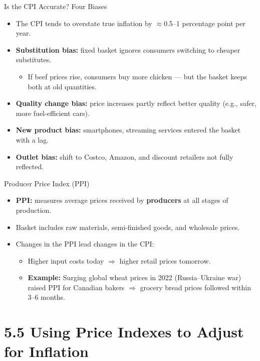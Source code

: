 \documentclass[aspectratio=169]{beamer}
\begin{document}
\begin{frame}{Is the CPI Accurate? Four Biases}
\transfade
\begin{itemize}[<+->]
  \item The CPI tends to \alert{overstate} true inflation by $\approx$0.5--1 percentage point per year.
  \item \textbf{Substitution bias:} fixed basket ignores consumers switching to cheaper substitutes.
  \begin{itemize}[<+->]
    \item If beef prices rise, consumers buy more chicken --- but the basket keeps both at old quantities.
  \end{itemize}
  \item \textbf{Quality change bias:} price increases partly reflect better quality (e.g., safer, more fuel-efficient cars).
  \item \textbf{New product bias:} smartphones, streaming services entered the basket with a lag.
  \item \textbf{Outlet bias:} shift to Costco, Amazon, and discount retailers not fully reflected.
\end{itemize}
\end{frame}

\begin{frame}{Producer Price Index (PPI)}
\transfade
\begin{itemize}[<+->]
  \item \textbf{PPI:} measures average prices received by \textbf{producers} at all stages of production.
  \item Basket includes raw materials, semi-finished goods, and wholesale prices.
  \item Changes in the PPI \alert{lead} changes in the CPI:
  \begin{itemize}[<+->]
    \item Higher input costs today $\Rightarrow$ higher retail prices tomorrow.
    \item \textbf{Example:} Surging global wheat prices in 2022 (Russia--Ukraine war) raised PPI for Canadian bakers $\Rightarrow$ grocery bread prices followed within 3--6 months.
  \end{itemize}
\end{itemize}
\end{frame}

\section{5.5 Using Price Indexes to Adjust for Inflation}
\end{document}

